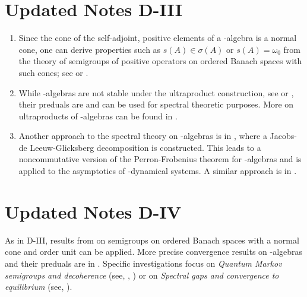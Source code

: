 \section*{Updated Notes D-III}
\begin{enumerate}
\item 
Since the cone of the self-adjoint, positive elements of a \CA-algebra is a normal cone, one can derive properties such as $s(A) \in \sigma(A)$ or $s(A) = \omega_{0}$ from the theory of semigroups of positive operators on ordered Banach spaces with such cones; see  or .

\item 
While \WA-algebras are not stable under the ultraproduct construction, see  or , their preduals are and can be used for spectral theoretic purposes. 
More on ultraproducts of \WA-algebras can be found in .

\item 
Another approach to the spectral theory on \WA-algebras is in , where a Jacobs-de Leeuw-Glicksberg decomposition is constructed.
This leads to a noncommutative version of the Perron-Frobenius theorem for \WA-algebras and is applied to the asymptotics of \WA-dynamical systems.
A similar approach is in .

\end{enumerate}
\section*{Updated Notes D-IV}
As in D-III, results from  on semigroups on ordered Banach spaces with a normal cone and order unit can be applied. 
More precise convergence results on \WA-algebras and their preduals are in .
Specific investigations focus on \emph{Quantum Markov semigroups and decoherence} (see, \eg, ) or on \emph{Spectral gaps and convergence to equilibrium} (see, \eg {}).
